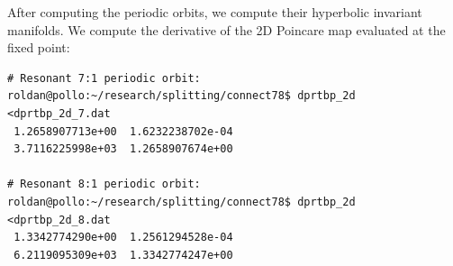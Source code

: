\documentclass[a4paper]{amsart}
\theoremstyle{remark}
\begin{document}

After computing the periodic orbits, we compute their hyperbolic
invariant manifolds.
We compute the derivative of the 2D Poincare map evaluated at the
fixed point:

\begin{verbatim}
# Resonant 7:1 periodic orbit:
roldan@pollo:~/research/splitting/connect78$ dprtbp_2d <dprtbp_2d_7.dat 
 1.2658907713e+00  1.6232238702e-04
 3.7116225998e+03  1.2658907674e+00

# Resonant 8:1 periodic orbit:
roldan@pollo:~/research/splitting/connect78$ dprtbp_2d <dprtbp_2d_8.dat 
 1.3342774290e+00  1.2561294528e-04
 6.2119095309e+03  1.3342774247e+00
\end{verbatim}
\end{document}
